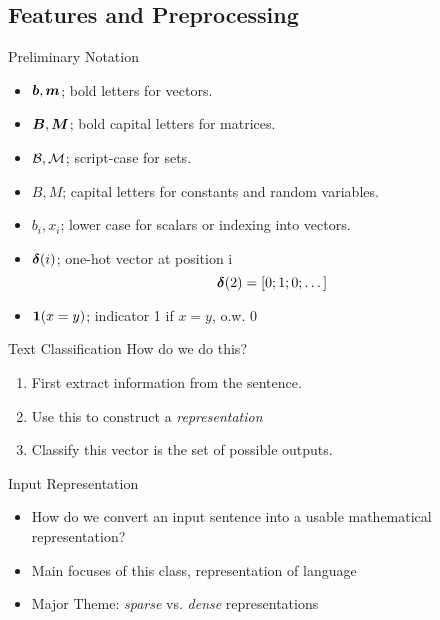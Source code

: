 \documentclass{beamer}
\begin{document}
\subsection{Features and Preprocessing}

\begin{frame}{Preliminary Notation}
  \begin{itemize}
  \item $\boldsymbol{b}, \boldsymbol{m}$;  bold letters for vectors.
  \item $\boldsymbol{B}, \boldsymbol{M}$;  bold capital letters for matrices.
  \item $\mathcal{B}, \mathcal{M}$;  script-case for sets.
  \item $B, M$; capital letters for constants and random variables.
  \item $b_i, x_i$; lower case for scalars or indexing into vectors.
  \end{itemize}


  \begin{itemize}
  \item $\boldsymbol{\delta}(i)$; one-hot vector at position i
    \[\boldsymbol{\delta}(2) = \left[ 0; 1; 0; \dots \right]\] 
  \item $\boldsymbol{1}(x = y)$; indicator 1 if $x = y$, o.w. 0

  \end{itemize}


\end{frame}


\begin{frame}{Text Classification}
  How do we do this? 

  \begin{enumerate}
  \item First extract information from the sentence. 
  \item Use this to construct a \textit{representation}
  \item Classify this vector is the set of possible outputs.
  \end{enumerate}

\end{frame}





\begin{frame}{Input Representation}
  \begin{itemize}
  \item How do we convert an input sentence into a usable mathematical representation?
  \item Main focuses of this class, representation of language
  \item Major Theme: \textit{sparse} vs. \textit{dense} representations
  \end{itemize}
\end{frame}
\end{document}

